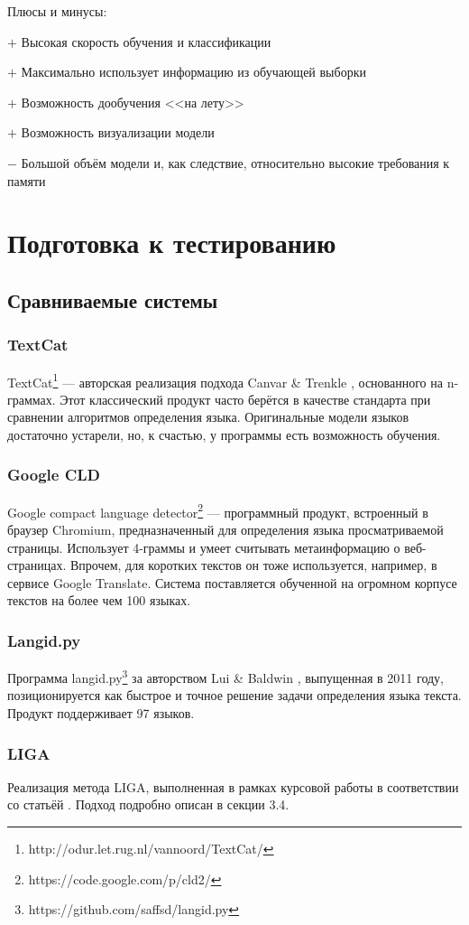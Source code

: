 \documentclass[a4paper, 14pt]{article}
\begin{document}
		\noindent Плюсы и минусы:
		
		$+$ Высокая скорость обучения и классификации
		
		$+$ Максимально использует информацию из обучающей выборки
		
		$+$ Возможность дообучения <<на лету>>
		
		$+$ Возможность визуализации модели
		
		$-$ Большой объём модели и, как следствие, относительно высокие требования к памяти
			
\section{Подготовка к тестированию}
		\subsection{Сравниваемые системы}
			\subsubsection{TextCat}
			TextCat\footnote{http://odur.let.rug.nl/vannoord/TextCat/} --- авторская реализация подхода Canvar \& Trenkle \cite{canvar}, основанного на n-граммах.
			Этот классический продукт часто берётся в качестве стандарта при сравнении алгоритмов определения языка. 
			Оригинальные модели языков достаточно устарели, но, к счастью, у программы есть возможность обучения.
			\subsubsection{Google CLD}
			Google compact language detector\footnote{https://code.google.com/p/cld2/} --- программный продукт, встроенный в браузер Chromium, 
			предназначенный для определения языка просматриваемой страницы. 
			Использует 4-граммы и умеет считывать метаинформацию
			о веб-страницах. Впрочем, для коротких текстов он тоже используется, например, в сервисе Google Translate. Система поставляется обученной
			на огромном корпусе текстов на более чем 100 языках.
			\subsubsection{Langid.py}
			Программа langid.py\footnote{https://github.com/saffsd/langid.py} за авторством Lui \& Baldwin \cite{langid}, выпущенная в 2011 году, позиционируется
			как быстрое и точное решение задачи определения языка текста. Продукт поддерживает 97 языков.
			\subsubsection{LIGA}
			Реализация метода LIGA, выполненная в рамках курсовой работы в соответствии со статьёй \cite{liga}. Подход подробно описан в секции 3.4.
\end{document}
